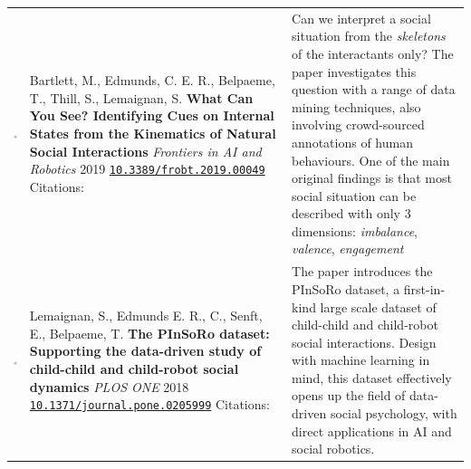 \documentclass[11pt]{report}
\begin{document}
\begin{tabular}{p{1.8cm}p{6cm}p{7cm}}
    \vspace{0cm}\includegraphics[width=2cm]{thumbs/2019-science.jpg} &

    Bartlett, M., Edmunds, C. E. R., Belpaeme, T., Thill, S., Lemaignan, S. 
    \textbf{What Can You See? Identifying Cues on Internal States from the
    Kinematics of Natural Social Interactions} 
    \newline \textit{Frontiers in AI and Robotics} 2019
    \newline \texttt{\href{https://doi.org/10.3389/frobt.2019.00049}{10.3389/frobt.2019.00049}}
    \newline Citations: 
    & \small Can we interpret a social situation from the \emph{skeletons} of
    the interactants only? The paper investigates this question with a range of data
    mining techniques, also involving crowd-sourced annotations of human
    behaviours. One of the main original findings is that most social situation
    can be described with only 3 dimensions: \emph{imbalance}, \emph{valence},
    \emph{engagement}\\


    \vspace{0cm}\includegraphics[width=2cm]{thumbs/2019-science.jpg} &

    Lemaignan, S., Edmunds E. R., C., Senft, E., Belpaeme, T. \textbf{The
    PInSoRo dataset: Supporting the data-driven study of child-child and
    child-robot social dynamics}
    \newline \textit{PLOS ONE} 2018
    \newline
    \texttt{\href{https://doi.org/10.1371/journal.pone.0205999}{10.1371/journal.pone.0205999}}
    \newline Citations: 
    & \small The paper introduces the PInSoRo dataset, a first-in-kind large
    scale dataset of child-child and child-robot social interactions. Design
    with machine learning in mind, this dataset effectively opens up the field
    of data-driven social psychology, with direct applications in AI and social
    robotics.\\



\end{tabular}
\end{document}

